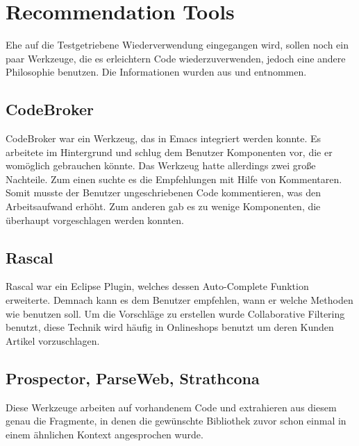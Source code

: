 \chapter{Recommendation Tools}
Ehe auf die Testgetriebene Wiederverwendung eingegangen wird, sollen noch ein paar Werkzeuge, die es erleichtern Code wiederzuverwenden, jedoch eine andere Philosophie benutzen. Die Informationen wurden aus \autocite{OS5/2011} und \autocite{Hum08} entnommen.

\section{CodeBroker}
CodeBroker war ein Werkzeug, das in Emacs integriert werden konnte. Es arbeitete im Hintergrund und schlug dem Benutzer Komponenten vor, die er womöglich gebrauchen könnte. Das Werkzeug hatte allerdings zwei große Nachteile. Zum einen suchte es die Empfehlungen mit Hilfe von Kommentaren. Somit musste der Benutzer ungeschriebenen Code kommentieren, was den Arbeitsaufwand erhöht. Zum anderen gab es zu wenige Komponenten, die überhaupt vorgeschlagen werden konnten.

\section{Rascal}
Rascal war ein Eclipse Plugin, welches dessen Auto-Complete Funktion erweiterte. Demnach kann es dem Benutzer empfehlen, wann er welche Methoden wie benutzen soll. Um die Vorschläge zu erstellen wurde Collaborative Filtering benutzt, diese Technik wird häufig in Onlineshops benutzt um deren Kunden Artikel vorzuschlagen.

\section{Prospector, ParseWeb, Strathcona}
Diese Werkzeuge arbeiten auf vorhandenem Code und extrahieren aus diesem genau die Fragmente, in denen die gewünschte Bibliothek zuvor schon einmal in einem ähnlichen Kontext angesprochen wurde.
